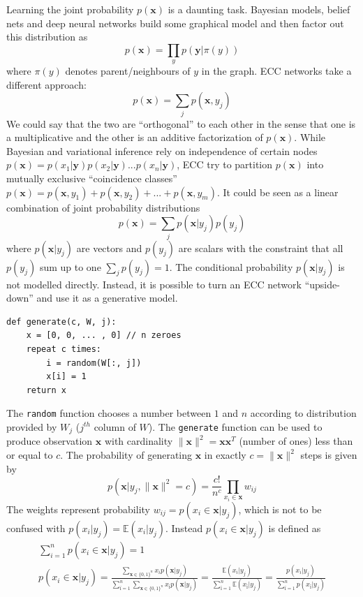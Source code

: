 \documentclass[12pt]{article}
\begin{document}
Learning the joint probability $p(\boldsymbol{x})$ is a daunting task. Bayesian models, belief nets and deep neural networks build some graphical model and then factor out this distribution as
\[
p(\boldsymbol{x})=\prod_{y} p(\boldsymbol{y}|\pi(y))
\]
where $\pi(y)$ denotes parent/neighbours of $y$ in the graph. ECC networks take a different approach: 
\[
p(\boldsymbol{x})=\sum_{j} p(\boldsymbol{x},y_j)
\]
We could say that the two are ``orthogonal'' to each other in the sense that one is a multiplicative and the other is an additive factorization of $p(\boldsymbol{x})$.  While Bayesian and variational inference rely on independence of certain nodes $p(\boldsymbol{x})=p(x_1|\boldsymbol{y})p(x_2|\boldsymbol{y})...p(x_n|\boldsymbol{y})$, ECC try to partition $p(\boldsymbol{x})$ into mutually exclusive ``coincidence classes''
$p(\boldsymbol{x})=p(\boldsymbol{x},y_1)+p(\boldsymbol{x},y_2)+...+p(\boldsymbol{x},y_m)$. It could be seen as a linear combination of joint probability distributions
\[
p(\boldsymbol{x})=\sum_{j} p(\boldsymbol{x}|y_j) p(y_j)
\]
where $p(\boldsymbol{x}|y_j)$ are vectors and $p(y_j)$ are scalars with the constraint that all  $p(y_j)$ sum up to one $\sum_{j} p(y_j)=1$. The conditional probability $p(\boldsymbol{x}|y_j)$  is not modelled directly. Instead, it is possible to turn an ECC network ``upside-down'' and use it as a generative model. 
\begin{lstlisting}
def generate(c, W, j):
    x = [0, 0, ... , 0] // n zeroes
    repeat c times:
        i = random(W[:, j])
        x[i] = 1
    return x
\end{lstlisting}
The \texttt{random} function chooses a number between $1$ and $n$ according to distribution provided by $W_j$ ($j^{th}$ column of $W$). The \texttt{generate} function can be used to produce observation $\boldsymbol{x}$ with cardinality $\lVert\boldsymbol{x} \rVert^2=\boldsymbol{x}\boldsymbol{x}^{T}$ (number of ones) less than or equal to $c$.  The probability of generating $\boldsymbol{x}$ in exactly $c=\lVert\boldsymbol{x} \rVert^2$ steps is given by 
 \[
 p(\boldsymbol{x}|y_j, \lVert\boldsymbol{x} \rVert^2 = c) = \frac{c!}{n^c}\prod_{x_i\in\boldsymbol{x}} w_{ij}
 \]
The weights represent probability $w_{ij} = p(x_i \in \boldsymbol{x}| y_j)$, which is not to be confused with $p(x_i|y_j)=\mathbb{E}(x_i|y_j)$. Instead $p(x_i \in \boldsymbol{x}| y_j)$ is defined as
\begin{gather*}
\sum_{i=1}^{n} p(x_i \in \boldsymbol{x}| y_j) = 1 \\
p(x_i \in \boldsymbol{x}| y_j) =
\frac{\sum_{\boldsymbol{x}\in\{0,1\}^n}x_i  p(\boldsymbol{x}|y_j) }{\sum_{ï=1}^{n} \sum_{\boldsymbol{x}\in\{0,1\}^n}    x_{ï}  p(\boldsymbol{x}|y_j) } = \frac{\mathbb{E}(x_i|y_j)}{\sum_{ï=1}^{n} \mathbb{E}(x_{ï}|y_j)} =  \frac{p(x_i|y_j)}{\sum_{ï=1}^{n} p(x_{ï}|y_j)} 
\end{gather*}
\end{document}

